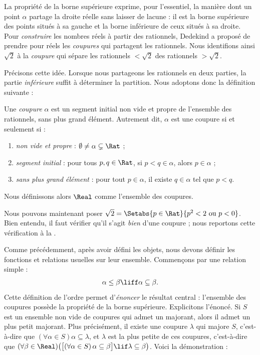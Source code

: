 \documentclass[../../../include/open-logic-section]{subfiles}
\begin{document}

La propriété de la borne supérieure exprime, pour l'essentiel, la manière
dont un point $\alpha$ partage la droite réelle sans laisser de lacune :
il est la borne supérieure des points situés à sa gauche et la borne
inférieure de ceux situés à sa droite. Pour \emph{construire} les nombres
réels à partir des rationnels, Dedekind a proposé de prendre pour réels
les \emph{coupures} qui partagent les rationnels. Nous identifions ainsi
$\sqrt{2}$ à la \emph{coupure} qui sépare les rationnels
$< \sqrt{2}$ des rationnels $> \sqrt{2}$.

Précisons cette idée. Lorsque nous partageons les rationnels en deux
parties, la partie \emph{inférieure} suffit à déterminer la partition.
Nous adoptons donc la définition suivante :

\begin{defn}[Coupure]
Une \emph{coupure} $\alpha$ est un segment initial non vide et propre
de l'ensemble des rationnels, sans plus grand élément. Autrement dit,
$\alpha$ est une coupure si et seulement si :
\begin{enumerate}
	\item \emph{non vide et propre} : $\emptyset \neq \alpha \subsetneq \Rat$ ;
	\item \emph{segment initial} : pour tous $p,q \in \Rat$, si $p < q \in \alpha$, alors $p \in \alpha$ ;
	\item \emph{sans plus grand élément} : pour tout $p \in \alpha$, il existe $q \in \alpha$ tel que $p < q$.
\end{enumerate}
Nous définissons alors $\Real$ comme l'ensemble des coupures.
\end{defn}

Nous pouvons maintenant poser $\sqrt{2} = \Setabs{p \in \Rat}{p^2 < 2\text{
ou }p < 0}$. Bien entendu, il faut vérifier qu'il s'agit \emph{bien}
d'une coupure ; nous reportons cette vérification à la .

Comme précédemment, après avoir défini les objets, nous devons définir
les fonctions et relations usuelles sur leur ensemble. Commençons par
une relation simple :
\begin{align*}
	\alpha \leq \beta \liff \alpha \subseteq \beta.
\end{align*}
Cette définition de l'ordre permet d'\emph{énoncer} le résultat central :
l'ensemble des coupures possède la propriété de la borne supérieure.
Explicitons l'énoncé. Si $S$ est un ensemble non vide de coupures qui
admet un majorant, alors il admet un plus petit majorant. Plus précisément,
il existe une coupure $\lambda$ qui majore $S$, c'est-à-dire que
$(\forall \alpha \in S)\alpha \subseteq \lambda$, et $\lambda$ est la plus
petite de ces coupures, c'est-à-dire que
$(\forall \beta \in \Real)\bigl(\bigl[(\forall \alpha \in S)\,\alpha \subseteq \beta\bigr] \lif \lambda \subseteq \beta\bigr)$.
Voici la démonstration :
\end{document}
